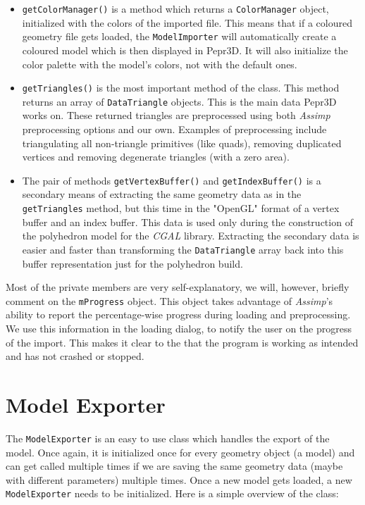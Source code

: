 \begin{itemize}
\item \texttt{getColorManager()} is a method which returns a \texttt{ColorManager} object, initialized with the colors of the imported file. This means that if a coloured geometry file gets loaded, the \texttt{ModelImporter} will automatically create a coloured model which is then displayed in Pepr3D. It will also initialize the color palette with the model's colors, not with the default ones.

\item \texttt{getTriangles()} is the most important method of the class. This method returns an array of \texttt{DataTriangle} objects. This is the main data Pepr3D works on. These returned triangles are preprocessed using both \textit{Assimp} preprocessing options and our own. Examples of preprocessing include triangulating all non-triangle primitives (like quads), removing duplicated vertices and removing degenerate triangles (with a zero area).

\item The pair of methods \texttt{getVertexBuffer()} and \texttt{getIndexBuffer()} is a secondary means of extracting the same geometry data as in the \texttt{get\-Triangles} method, but this time in the "OpenGL" format of a vertex buffer and an index buffer. This data is used only during the construction of the polyhedron model for the \textit{CGAL} library. Extracting the secondary data is easier and faster than transforming the \texttt{DataTriangle} array back into this buffer representation just for the polyhedron build.

\end{itemize}

Most of the private members are very self-explanatory, we will, however, briefly comment on the \texttt{mProgress} object. This object takes advantage of \textit{Assimp}'s ability to report the percentage-wise progress during loading and preprocessing. We use this information in the loading dialog, to notify the user on the progress of the import. This makes it clear to the that the program is working as intended and has not crashed or stopped.

\section{Model Exporter}

The \texttt{ModelExporter} is an easy to use class which handles the export of the model. Once again, it is initialized once for every geometry object (a model) and can get called multiple times if we are saving the same geometry data (maybe with different parameters) multiple times. Once a new model gets loaded, a new \texttt{ModelExporter} needs to be initialized. Here is a simple overview of the class:

